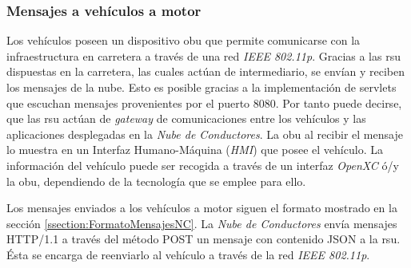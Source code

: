 \subsubsection{Mensajes a vehículos a motor}\label{sssection:mensajesvehiculomotor}
Los vehículos poseen un dispositivo \gls{obu} que permite comunicarse con la infraestructura
en carretera a través de una red \emph{IEEE 802.11p}. Gracias a las \gls{rsu} dispuestas
en la carretera, las cuales actúan de intermediario, se envían y reciben los mensajes
de la nube. Esto es posible gracias a la implementación de servlets que escuchan mensajes
provenientes por el puerto 8080. Por tanto puede decirse, que las \gls{rsu} actúan de
\emph{gateway} de comunicaciones entre los vehículos y las aplicaciones desplegadas
en la \emph{Nube de Conductores}. La \gls{obu} al recibir el mensaje lo muestra en
un Interfaz Humano-Máquina (\emph{HMI}) que posee el vehículo. La información del vehículo
puede ser recogida a través de un interfaz \emph{OpenXC} ó/y la \gls{obu}, dependiendo
de la tecnología que se emplee para ello.

Los mensajes enviados a los vehículos a motor siguen el formato mostrado en la sección
\ref{ssection:FormatoMensajesNC}. La \emph{Nube de Conductores} envía mensajes HTTP/1.1
a través del método POST un mensaje con contenido JSON a la \gls{rsu}. Ésta se encarga
de reenviarlo al vehículo a través de la red \emph{IEEE 802.11p}.

